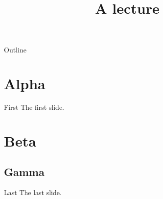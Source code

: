 

\title{A lecture}

\AtBeginSection[]
{
  \begin{frame}
    \tableofcontents[currentsection]
  \end{frame}
}



\begin{frame}{Outline}
  \tableofcontents
\end{frame}

\section{Alpha}

\begin{frame}{First}
  The first slide.
\end{frame}

\section{Beta}



\subsection{Gamma}

\begin{frame}{Last}
  The last slide.
\end{frame}


